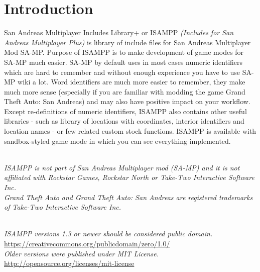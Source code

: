 \documentclass{article}
\begin{document}
\newpage
\section{Introduction}
San Andreas Multiplayer Includes Library+ or ISAMPP \textit{(Includes for San Andreas Multiplayer Plus)} is library of include files for San Andreas Multiplayer Mod SA-MP. Purpose of ISAMPP is to make development of game modes for SA-MP much easier. SA-MP by default uses in most cases numeric identifiers which are hard to remember and without enough experience you have to use SA-MP wiki a lot. Word identifiers are much more easier to remember, they make much more sense (especially if you are familiar with modding the game Grand Theft Auto: San Andreas) and may also have positive impact on your workflow. Except re-definitions of numeric identifiers, ISAMPP also contains other useful libraries - such as library of locations with coordinates, interior identifiers and location names - or few related custom stock functions. ISAMPP is available with sandbox-styled game mode in which you can see everything implemented.

\textit{\\ISAMPP is not part of San Andreas Multiplayer mod (SA-MP) and it is not affiliated with Rockstar Games, Rockstar North or Take-Two Interactive Software Inc.}
\textit{\\Grand Theft Auto and Grand Theft Auto: San Andreas are registered trademarks of Take-Two Interactive Software Inc.}

\textit{\\ISAMPP versions 1.3 or newer should be considered public domain.}
\\\url{https://creativecommons.org/publicdomain/zero/1.0/}
\bigskip
\\\textit{Older versions were published under MIT License.}
\\\url{http://opensource.org/licenses/mit-license}
\end{document}
